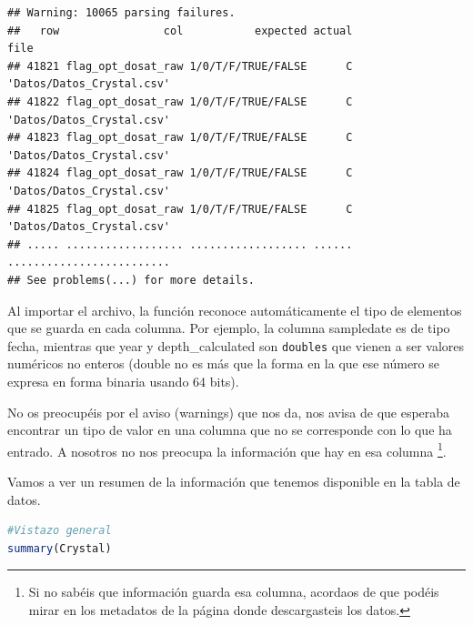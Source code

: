 \documentclass[
]{book}
\newcommand{\passthrough}[1]{#1}
\begin{document}
\begin{lstlisting}
## Warning: 10065 parsing failures.
##   row                col           expected actual                      file
## 41821 flag_opt_dosat_raw 1/0/T/F/TRUE/FALSE      C 'Datos/Datos_Crystal.csv'
## 41822 flag_opt_dosat_raw 1/0/T/F/TRUE/FALSE      C 'Datos/Datos_Crystal.csv'
## 41823 flag_opt_dosat_raw 1/0/T/F/TRUE/FALSE      C 'Datos/Datos_Crystal.csv'
## 41824 flag_opt_dosat_raw 1/0/T/F/TRUE/FALSE      C 'Datos/Datos_Crystal.csv'
## 41825 flag_opt_dosat_raw 1/0/T/F/TRUE/FALSE      C 'Datos/Datos_Crystal.csv'
## ..... .................. .................. ...... .........................
## See problems(...) for more details.
\end{lstlisting}

Al importar el archivo, la función reconoce automáticamente el tipo de elementos que se guarda en cada columna. Por ejemplo, la columna sampledate es de tipo fecha, mientras que year y depth\_calculated son \passthrough{\lstinline!doubles!} que vienen a ser valores numéricos no enteros (double no es más que la forma en la que ese número se expresa en forma binaria usando 64 bits).

No os preocupéis por el aviso (warnings) que nos da, nos avisa de que esperaba encontrar un tipo de valor en una columna que no se corresponde con lo que ha entrado. A nosotros no nos preocupa la información que hay en esa columna \footnote{Si no sabéis que información guarda esa columna, acordaos de que podéis mirar en los metadatos de la página donde descargasteis los datos.}.

Vamos a ver un resumen de la información que tenemos disponible en la tabla de datos.

\begin{lstlisting}[language=R]
#Vistazo general
summary(Crystal)
\end{lstlisting}
\end{document}
